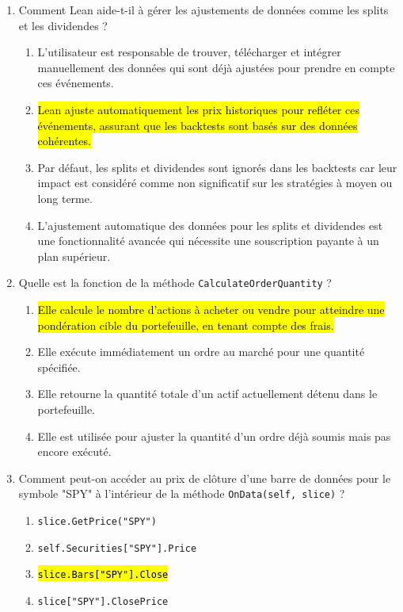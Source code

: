 \documentclass[a4paper,12pt]{article}
\begin{document}
\begin{enumerate}
    \item Comment Lean aide-t-il à gérer les ajustements de données comme les splits et les dividendes ?
    \begin{enumerate}[label=(\Alph*)]
        \item L'utilisateur est responsable de trouver, télécharger et intégrer manuellement des données qui sont déjà ajustées pour prendre en compte ces événements.
        \item \hl{Lean ajuste automatiquement les prix historiques pour refléter ces événements, assurant que les backtests sont basés sur des données cohérentes.}
        \item Par défaut, les splits et dividendes sont ignorés dans les backtests car leur impact est considéré comme non significatif sur les stratégies à moyen ou long terme.
        \item L'ajustement automatique des données pour les splits et dividendes est une fonctionnalité avancée qui nécessite une souscription payante à un plan supérieur.
    \end{enumerate}
    
    \item Quelle est la fonction de la méthode \texttt{CalculateOrderQuantity} ?
    \begin{enumerate}[label=(\Alph*)]
        \item \hl{Elle calcule le nombre d'actions à acheter ou vendre pour atteindre une pondération cible du portefeuille, en tenant compte des frais.}
        \item Elle exécute immédiatement un ordre au marché pour une quantité spécifiée.
        \item Elle retourne la quantité totale d'un actif actuellement détenu dans le portefeuille.
        \item Elle est utilisée pour ajuster la quantité d'un ordre déjà soumis mais pas encore exécuté.
    \end{enumerate}

    \item Comment peut-on accéder au prix de clôture d'une barre de données pour le symbole "SPY" à l'intérieur de la méthode \texttt{OnData(self, slice)} ?
    \begin{enumerate}[label=(\Alph*)]
        \item \texttt{slice.GetPrice("SPY")}
        \item \texttt{self.Securities["SPY"].Price}
        \item \hl{\texttt{slice.Bars["SPY"].Close}}
        \item \texttt{slice["SPY"].ClosePrice}
    \end{enumerate}


\end{enumerate}
\end{document}
